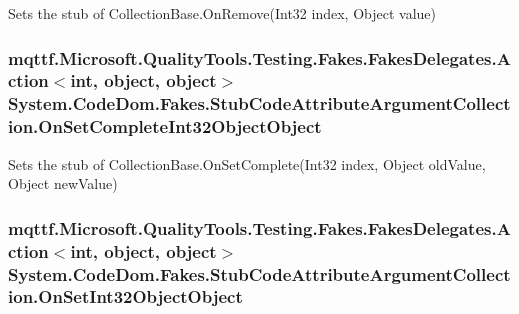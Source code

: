 Sets the stub of Collection\-Base.\-On\-Remove(\-Int32 index, Object value)

\hypertarget{class_system_1_1_code_dom_1_1_fakes_1_1_stub_code_attribute_argument_collection_a3111f3ab627d11de1cb156967aac6b80}{
\subsubsection[{On\-Set\-Complete\-Int32\-Object\-Object}]{\setlength{\rightskip}{0pt plus 5cm}mqttf.\-Microsoft.\-Quality\-Tools.\-Testing.\-Fakes.\-Fakes\-Delegates.\-Action$<$int, object, object$>$ System.\-Code\-Dom.\-Fakes.\-Stub\-Code\-Attribute\-Argument\-Collection.\-On\-Set\-Complete\-Int32\-Object\-Object}}\label{class_system_1_1_code_dom_1_1_fakes_1_1_stub_code_attribute_argument_collection_a3111f3ab627d11de1cb156967aac6b80}


Sets the stub of Collection\-Base.\-On\-Set\-Complete(\-Int32 index, Object old\-Value, Object new\-Value)

\hypertarget{class_system_1_1_code_dom_1_1_fakes_1_1_stub_code_attribute_argument_collection_ada7527b61362feddb153201e1b107e31}{
\subsubsection[{On\-Set\-Int32\-Object\-Object}]{\setlength{\rightskip}{0pt plus 5cm}mqttf.\-Microsoft.\-Quality\-Tools.\-Testing.\-Fakes.\-Fakes\-Delegates.\-Action$<$int, object, object$>$ System.\-Code\-Dom.\-Fakes.\-Stub\-Code\-Attribute\-Argument\-Collection.\-On\-Set\-Int32\-Object\-Object}}\label{class_system_1_1_code_dom_1_1_fakes_1_1_stub_code_attribute_argument_collection_ada7527b61362feddb153201e1b107e31}


